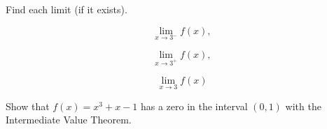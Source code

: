 \documentclass[11pt]{exam}
\begin{document}
\begin{questions}
Find each limit (if it exists).

\begin{minipage}{.3\linewidth}
\begin{equation*}
 \lim_{x\to 3^{-}}f(x),
\end{equation*}
\end{minipage}%
\begin{minipage}{.3\linewidth}
\begin{equation*}
 \lim_{x\to 3^{+}}f(x),
\end{equation*}
\end{minipage}%
\begin{minipage}{.3\linewidth}
\begin{equation*}
 \lim_{x\to 3}f(x)
\end{equation*}
\end{minipage}

\vfill

\question[15]
Show that $f(x)=x^{3}+x-1$ has a zero in the interval $(0,1)$ with the Intermediate Value Theorem.

\vfill






\end{questions}
\end{document}
